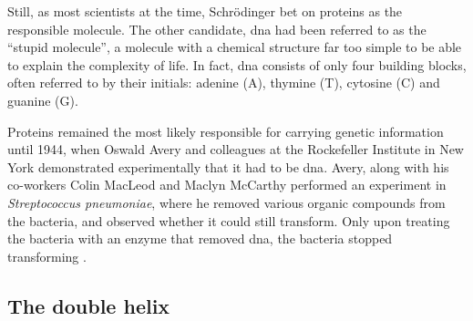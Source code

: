 Still, as most scientists at the time, Schrödinger bet on proteins as the responsible molecule. 
The other candidate, \gls{dna} had been referred to as the “stupid molecule”, a molecule with a chemical structure far too simple to be able to explain the complexity of life. 
In fact, \gls{dna} consists of only four building blocks, often referred to by their initials: adenine (A), thymine (T), cytosine (C) and guanine (G).

Proteins remained the most likely responsible for carrying genetic information until 1944, when Oswald Avery and colleagues at the Rockefeller Institute in New York demonstrated experimentally that it had to be \gls{dna}. 
Avery, along with his co-workers Colin MacLeod and Maclyn McCarthy performed an experiment in \textit{Streptococcus pneumoniae}, where he removed various organic compounds from the bacteria, and observed whether it could still transform. 
Only upon treating the bacteria with an enzyme that removed \gls{dna}, the bacteria stopped transforming \cite{avery1944studies}.\\






\subsection{The double helix} %

